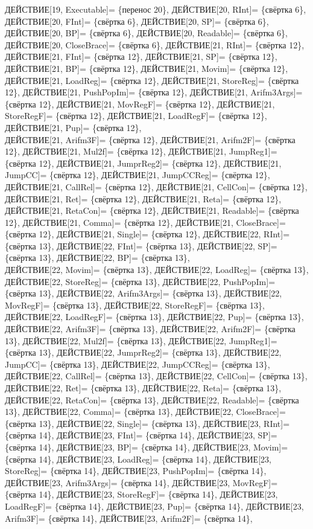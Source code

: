 \documentclass[a0]{a0poster}
\begin{document}
ДЕЙСТВИЕ[19, Executable]= \{перенос 20\}, ДЕЙСТВИЕ[20, RInt]= \{свёртка 6\}, ДЕЙСТВИЕ[20, FInt]= \{свёртка 6\}, ДЕЙСТВИЕ[20, SP]= \{свёртка 6\}, ДЕЙСТВИЕ[20, BP]= \{свёртка 6\}, ДЕЙСТВИЕ[20, Readable]= \{свёртка 6\}, ДЕЙСТВИЕ[20, CloseBrace]= \{свёртка 6\}, ДЕЙСТВИЕ[21, RInt]= \{свёртка 12\}, ДЕЙСТВИЕ[21, FInt]= \{свёртка 12\}, ДЕЙСТВИЕ[21, SP]= \{свёртка 12\}, ДЕЙСТВИЕ[21, BP]= \{свёртка 12\}, ДЕЙСТВИЕ[21, Movim]= \{свёртка 12\}, ДЕЙСТВИЕ[21, LoadReg]= \{свёртка 12\}, ДЕЙСТВИЕ[21, StoreReg]= \{свёртка 12\}, ДЕЙСТВИЕ[21, PushPopIm]= \{свёртка 12\}, ДЕЙСТВИЕ[21, Arifm3Args]= \{свёртка 12\}, ДЕЙСТВИЕ[21, MovRegF]= \{свёртка 12\}, ДЕЙСТВИЕ[21, StoreRegF]= \{свёртка 12\}, ДЕЙСТВИЕ[21, LoadRegF]= \{свёртка 12\}, ДЕЙСТВИЕ[21, Pup]= \{свёртка 12\}, \\
ДЕЙСТВИЕ[21, Arifm3F]= \{свёртка 12\}, ДЕЙСТВИЕ[21, Arifm2F]= \{свёртка 12\}, ДЕЙСТВИЕ[21, Mul2f]= \{свёртка 12\}, ДЕЙСТВИЕ[21, JumpReg1]= \{свёртка 12\}, ДЕЙСТВИЕ[21, JumprReg2]= \{свёртка 12\}, ДЕЙСТВИЕ[21, JumpCC]= \{свёртка 12\}, ДЕЙСТВИЕ[21, JumpCCReg]= \{свёртка 12\}, ДЕЙСТВИЕ[21, CallRel]= \{свёртка 12\}, ДЕЙСТВИЕ[21, CellCon]= \{свёртка 12\}, ДЕЙСТВИЕ[21, Ret]= \{свёртка 12\}, ДЕЙСТВИЕ[21, Reta]= \{свёртка 12\}, ДЕЙСТВИЕ[21, RetaCon]= \{свёртка 12\}, ДЕЙСТВИЕ[21, Readable]= \{свёртка 12\}, ДЕЙСТВИЕ[21, Comma]= \{свёртка 12\}, ДЕЙСТВИЕ[21, CloseBrace]= \{свёртка 12\}, ДЕЙСТВИЕ[21, Single]= \{свёртка 12\}, ДЕЙСТВИЕ[22, RInt]= \{свёртка 13\}, ДЕЙСТВИЕ[22, FInt]= \{свёртка 13\}, ДЕЙСТВИЕ[22, SP]= \{свёртка 13\}, ДЕЙСТВИЕ[22, BP]= \{свёртка 13\}, \\
ДЕЙСТВИЕ[22, Movim]= \{свёртка 13\}, ДЕЙСТВИЕ[22, LoadReg]= \{свёртка 13\}, ДЕЙСТВИЕ[22, StoreReg]= \{свёртка 13\}, ДЕЙСТВИЕ[22, PushPopIm]= \{свёртка 13\}, ДЕЙСТВИЕ[22, Arifm3Args]= \{свёртка 13\}, ДЕЙСТВИЕ[22, MovRegF]= \{свёртка 13\}, ДЕЙСТВИЕ[22, StoreRegF]= \{свёртка 13\}, ДЕЙСТВИЕ[22, LoadRegF]= \{свёртка 13\}, ДЕЙСТВИЕ[22, Pup]= \{свёртка 13\}, ДЕЙСТВИЕ[22, Arifm3F]= \{свёртка 13\}, ДЕЙСТВИЕ[22, Arifm2F]= \{свёртка 13\}, ДЕЙСТВИЕ[22, Mul2f]= \{свёртка 13\}, ДЕЙСТВИЕ[22, JumpReg1]= \{свёртка 13\}, ДЕЙСТВИЕ[22, JumprReg2]= \{свёртка 13\}, ДЕЙСТВИЕ[22, JumpCC]= \{свёртка 13\}, ДЕЙСТВИЕ[22, JumpCCReg]= \{свёртка 13\}, ДЕЙСТВИЕ[22, CallRel]= \{свёртка 13\}, ДЕЙСТВИЕ[22, CellCon]= \{свёртка 13\}, ДЕЙСТВИЕ[22, Ret]= \{свёртка 13\}, ДЕЙСТВИЕ[22, Reta]= \{свёртка 13\}, \\
ДЕЙСТВИЕ[22, RetaCon]= \{свёртка 13\}, ДЕЙСТВИЕ[22, Readable]= \{свёртка 13\}, ДЕЙСТВИЕ[22, Comma]= \{свёртка 13\}, ДЕЙСТВИЕ[22, CloseBrace]= \{свёртка 13\}, ДЕЙСТВИЕ[22, Single]= \{свёртка 13\}, ДЕЙСТВИЕ[23, RInt]= \{свёртка 14\}, ДЕЙСТВИЕ[23, FInt]= \{свёртка 14\}, ДЕЙСТВИЕ[23, SP]= \{свёртка 14\}, ДЕЙСТВИЕ[23, BP]= \{свёртка 14\}, ДЕЙСТВИЕ[23, Movim]= \{свёртка 14\}, ДЕЙСТВИЕ[23, LoadReg]= \{свёртка 14\}, ДЕЙСТВИЕ[23, StoreReg]= \{свёртка 14\}, ДЕЙСТВИЕ[23, PushPopIm]= \{свёртка 14\}, ДЕЙСТВИЕ[23, Arifm3Args]= \{свёртка 14\}, ДЕЙСТВИЕ[23, MovRegF]= \{свёртка 14\}, ДЕЙСТВИЕ[23, StoreRegF]= \{свёртка 14\}, ДЕЙСТВИЕ[23, LoadRegF]= \{свёртка 14\}, ДЕЙСТВИЕ[23, Pup]= \{свёртка 14\}, ДЕЙСТВИЕ[23, Arifm3F]= \{свёртка 14\}, ДЕЙСТВИЕ[23, Arifm2F]= \{свёртка 14\}, \\
\end{document}
